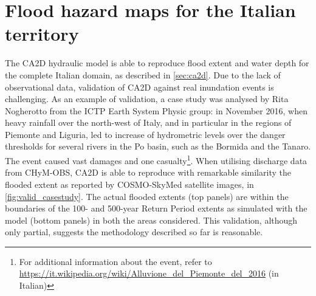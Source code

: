 \section{Flood hazard maps for the Italian territory}\label{sec:results_flood}
The CA2D hydraulic model is able to reproduce flood extent and water depth for the complete Italian domain, as described in \cref{sec:ca2d}.
Due to the lack of observational data, validation of CA2D against real inundation events is challenging.
As an example of validation, a case study was analysed by Rita Nogherotto from the ICTP Earth System Physic group: in November 2016, when heavy rainfall over the north-west of Italy, and in particular in the regions of Piemonte and Liguria, led to increase of hydrometric levels over the danger thresholds for several rivers in the Po basin, such as the Bormida and the Tanaro.
The event caused vast damages and one casualty\footnote{For additional information about the event, refer to \url{https://it.wikipedia.org/wiki/Alluvione_del_Piemonte_del_2016} (in Italian)}. 
When utilising discharge data from CHyM-OBS, CA2D is able to reproduce with remarkable similarity the flooded extent as reported by COSMO-SkyMed satellite images, in \cref{fig:valid_casestudy}.
The actual flooded extents (top panels) are within the boundaries of the 100- and 500-year Return Period extents as simulated with the model (bottom panels) in both the areas considered.
This validation, although only partial, suggests the methodology described so far is reasonable.
